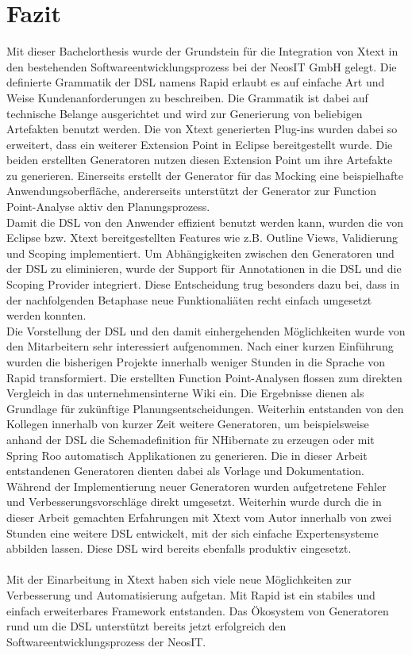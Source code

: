\documentclass[a4paper,12pt]{scrreprt}
\begin{document}
\chapter{Fazit}
Mit dieser Bachelorthesis wurde der Grundstein für die Integration von Xtext in den bestehenden Softwareentwicklungsprozess bei der NeosIT GmbH gelegt. Die definierte Grammatik der DSL namens Rapid erlaubt es auf einfache Art und Weise Kundenanforderungen zu beschreiben. Die Grammatik ist dabei auf technische Belange ausgerichtet und wird zur Generierung von beliebigen Artefakten benutzt werden.
Die von Xtext generierten Plug-ins wurden dabei so erweitert, dass ein weiterer Extension Point in Eclipse bereitgestellt wurde. 
Die beiden erstellten Generatoren nutzen diesen Extension Point um ihre Artefakte zu generieren. Einerseits erstellt der Generator für das Mocking eine beispielhafte Anwendungsoberfläche, andererseits unterstützt der Generator zur Function Point-Analyse aktiv den Planungsprozess.
\\
Damit die DSL von den Anwender effizient benutzt werden kann, wurden die von Eclipse bzw. Xtext bereitgestellten Features wie z.B. Outline Views, Validierung und Scoping implementiert. Um Abhängigkeiten zwischen den Generatoren und der DSL zu eliminieren, wurde der Support für Annotationen in die DSL und die Scoping Provider integriert. Diese Entscheidung trug besonders dazu bei, dass in der nachfolgenden Betaphase neue Funktionaliäten recht einfach umgesetzt werden konnten.
\\Die Vorstellung der DSL und den damit einhergehenden Möglichkeiten wurde von den Mitarbeitern sehr interessiert aufgenommen. Nach einer kurzen Einführung wurden die bisherigen Projekte innerhalb weniger Stunden in die Sprache von Rapid transformiert. Die erstellten Function Point-Analysen flossen zum direkten Vergleich in das unternehmensinterne Wiki ein. Die Ergebnisse dienen als Grundlage für zukünftige Planungsentscheidungen.
Weiterhin entstanden von den Kollegen innerhalb von kurzer Zeit weitere Generatoren, um beispielsweise anhand der DSL die Schemadefinition für NHibernate zu erzeugen oder mit Spring Roo automatisch Applikationen zu generieren. Die in dieser Arbeit entstandenen Generatoren dienten dabei als Vorlage und Dokumentation. Während der Implementierung neuer Generatoren wurden aufgetretene Fehler und Verbesserungsvorschläge direkt umgesetzt.
Weiterhin wurde durch die in dieser Arbeit gemachten Erfahrungen mit Xtext vom Autor innerhalb von zwei Stunden eine weitere DSL entwickelt, mit der sich einfache Expertensysteme abbilden lassen. Diese DSL wird bereits ebenfalls produktiv eingesetzt.
\\
\\
Mit der Einarbeitung in Xtext haben sich viele neue Möglichkeiten zur Verbesserung und Automatisierung aufgetan. Mit Rapid ist ein stabiles und einfach erweiterbares Framework entstanden. Das Ökosystem von Generatoren rund um die DSL unterstützt bereits jetzt erfolgreich den Softwareentwicklungsprozess der NeosIT.
\end{document}
